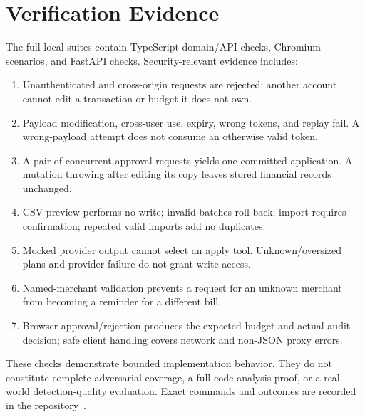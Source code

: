 \documentclass[conference,a4paper]{IEEEtran}
\begin{document}
\section{Verification Evidence}
The full local suites contain \UnitTests{} TypeScript domain/API checks, \BrowserTests{} Chromium scenarios, and \PythonTests{} FastAPI checks. Security-relevant evidence includes:
\begin{enumerate}
\item Unauthenticated and cross-origin requests are rejected; another account cannot edit a transaction or budget it does not own.
\item Payload modification, cross-user use, expiry, wrong tokens, and replay fail. A wrong-payload attempt does not consume an otherwise valid token.
\item A pair of concurrent approval requests yields one committed application. A mutation throwing after editing its copy leaves stored financial records unchanged.
\item CSV preview performs no write; invalid batches roll back; import requires confirmation; repeated valid imports add no duplicates.
\item Mocked provider output cannot select an apply tool. Unknown/oversized plans and provider failure do not grant write access.
\item Named-merchant validation prevents a request for an unknown merchant from becoming a reminder for a different bill.
\item Browser approval/rejection produces the expected budget and actual audit decision; safe client handling covers network and non-JSON proxy errors.
\end{enumerate}
These checks demonstrate bounded implementation behavior. They do not constitute complete adversarial coverage, a full code-analysis proof, or a real-world detection-quality evaluation. Exact commands and outcomes are recorded in the repository~\cite{repo}.
\end{document}
